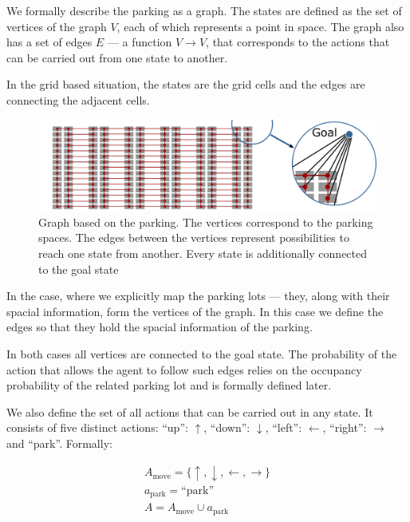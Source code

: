 We formally describe the parking as a graph. The states are defined as the set
of vertices of the graph $V$, each of which represents a point in space. The
graph also has a set of edges $E$ --- a function $V \rightarrow V$, that
corresponds to the actions that can be carried out from one state to another.

In the grid based situation, the states are the grid cells and the edges are
connecting the adjacent cells.

\begin{figure}[t]
    \begin{center}
        \includegraphics[width=\textwidth]{pictures/graph.pdf}
    \end{center}
    \caption{Graph based on the parking. The vertices correspond to the parking spaces. The edges between the vertices represent possibilities to reach one state from another. Every state is additionally connected to the goal state}
    \vspace{-5mm}
    \label{fig:graph}
\end{figure}

In the case, where we explicitly map the parking lots --- they, along with
their spacial information, form the vertices of the graph. In this case we
define the edges so that they hold the spacial information of the parking.

In both cases all vertices are connected to the goal state. The probability of
the action that allows the agent to follow such edges relies on the occupancy
probability of the related parking lot and is formally defined later.

We also define the set of all actions that can be carried out in any state. It
consists of five distinct actions: ``up'': $\uparrow$, ``down'': $\downarrow$,
``left'': $\leftarrow$, ``right'': $\rightarrow$ and ``park''. Formally:

\begin{eqnarray}
A_{\mbox{move}} = \{ \uparrow, \downarrow, \leftarrow, \rightarrow \} \\
a_{\mbox{park}} = \mbox{``park''} \\
A = A_{\mbox{move}} \cup a_{\mbox{park}}
\end{eqnarray}

